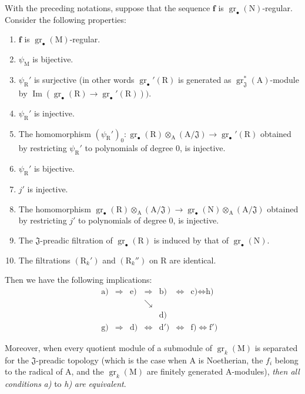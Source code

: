 \begin{proposition}[19.6.3]
\label{IV.19.6.3}
With the preceding notations, suppose that the sequence $\mathbf{f}$ is $\operatorname{gr}_\bullet(\mathrm{N})$-regular. Consider the following properties:
\begin{enumerate}
\item[\rm a)] $\mathbf{f}$ is $\operatorname{gr}_\bullet(\mathrm{M})$-regular.
\item[\rm b)] $\psi_\mathrm{M}$ is bijective.
\item[\rm c)] $\psi_\mathrm{R}'$ is surjective (in other words $\operatorname{gr}_\bullet'(\mathrm{R})$ is generated as $\operatorname{gr}_\mathfrak{J}^*(\mathrm{A})$-module by $\operatorname{Im}(\operatorname{gr}_\bullet(\mathrm{R})\to\operatorname{gr}_\bullet'(\mathrm{R})))$.
\item[\rm d)] $\psi_\mathrm{R}'$ is injective.
\item[\rm d$'$)] The homomorphism $(\psi_\mathrm{R}')_0:\operatorname{gr}_\bullet(\mathrm{R})\otimes_\mathrm{A}(\mathrm{A}/\mathfrak{J})\to\operatorname{gr}_\bullet'(\mathrm{R})$ obtained by restricting $\psi_\mathrm{R}'$ to polynomials of degree $0$, is injective.
\item[\rm e)] $\psi_\mathrm{R}'$ is bijective.
\item[\rm f)] $j'$ is injective.
\item[\rm f$'$)] The homomorphism $\operatorname{gr}_\bullet(\mathrm{R})\otimes_\mathrm{A}(\mathrm{A}/\mathfrak{J})\to\operatorname{gr}_\bullet(\mathrm{N})\otimes_\mathrm{A}(\mathrm{A}/\mathfrak{J})$ obtained by restricting $j'$ to polynomials of degree $0$, is injective.
\item[\rm g)] The $\mathfrak{J}$-preadic filtration of $\operatorname{gr}_\bullet(\mathrm{R})$ is induced by that of $\operatorname{gr}_\bullet(\mathrm{N})$.
\item[\rm h)] The filtrations $(\mathrm{R}_k')$ and $(\mathrm{R}_k'')$ on $\mathrm{R}$ are identical.
\end{enumerate}
Then we have the following implications:
\[
\begin{array}{ccccccccc}
  & & \text{a)} & \Rightarrow & \text{e)} & \Rightarrow & \text{b)} & \Leftrightarrow & \text{c)} \Leftrightarrow \text{h)} \\
  & & & & & \searrow & & & \\
  & & & & & & \text{d)} & & \\
  & & \text{g)} & \Rightarrow & \text{d)} & \Leftrightarrow & \text{d$'$)} & \Leftrightarrow & \text{f)} \Leftrightarrow \text{f$'$)}
\end{array}
\]

Moreover, when every quotient module of a submodule of $\operatorname{gr}_k(\mathrm{M})$ is separated for the $\mathfrak{J}$-preadic topology (which is the case when $\mathrm{A}$ is Noetherian, the $f_i$ belong to the radical of $\mathrm{A}$, and the $\operatorname{gr}_k(\mathrm{M})$ are finitely generated $\mathrm{A}$-modules), \emph{then all conditions} \emph{a)} to \emph{h)} \emph{are equivalent}.
\end{proposition}

